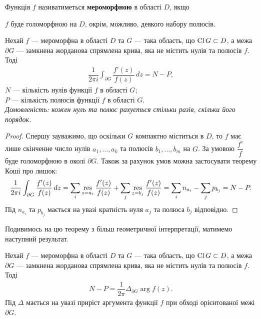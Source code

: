 \documentclass{math_library}
\begin{document}
\begin{definition}
Функція $f$ називатиметься \textbf{мероморфною} в області $D$, якщо
\begin{center}
$f$ буде голоморфною на $D$, окрім, можливо, деякого набору полюсів.
\end{center}
\end{definition}

\begin{theorem}
Нехай $f$ --- мероморфна в області $D$ та $G$ --- така область, що $\operatorname{Cl} G \subset D$, а межа $\partial G$ --- замкнена жорданова спрямлена крива, яка не містить нулів та полюсів $f$. Тоді
\begin{align*}
\dfrac{1}{2\pi i} \int_{\partial G} \dfrac{f'(z)}{f(z)}\,dz = N - P,
\end{align*}
$N$ --- кількість нулів функції $f$ в області $G$;\\
$P$ --- кількість полюсів функції $f$ в області $G$.
\bigskip \\
\textit{Домовленість: кожен нуль та полюс рахується стільки разів, скільки його порядок.}
\end{theorem}

\begin{proof}
Спершу зауважимо, що оскільки $G$ компактно міститься в $D$, то $f$ має лише скінченне число нулів $a_1,\dots,a_k$ та полюсів $b_1,\dots,b_m$ на $G$. За умовою $\dfrac{f'}{f}$ буде голоморфною в околі $\partial G$. Також за рахунок умов можна застосувати теорему Коші про лишок:
\begin{align*}
\dfrac{1}{2 \pi i} \int_{\partial G} \dfrac{f'(z)}{f(z)}\,dz = \sum_{i} \operatorname*{res}_{z = a_i} \dfrac{f'(z)}{f(z)} + \sum_j \operatorname*{res}_{z = b_j} \dfrac{f'(z)}{f(z)} = \sum_i n_{a_i} - \sum_j p_{b_j} = N-P.
\end{align*}
Під $n_{a_i}$ та $p_{b_j}$ мається на увазі кратність нуля $a_j$ та полюса $b_j$ відповідно.
\end{proof}

Подивимось на цю теорему з більш геометричної інтерпретації, матимемо наступний результат.
\begin{theorem}
Нехай $f$ --- мероморфна в області $D$ та $G$ --- така область, що $\operatorname{Cl} G \subset D$, а межа $\partial G$ --- замкнена жорданова спрямлена крива, яка не містить нулів та полюсів $f$. Тоді
\begin{align*}
N-P = \dfrac{1}{2\pi} \Delta_{\partial G} \arg f(z).
\end{align*}
Під $\Delta$ мається на увазі приріст аргумента функції $f$ при обході орієнтованої межі $\partial G$.
\end{theorem}
\end{document}
